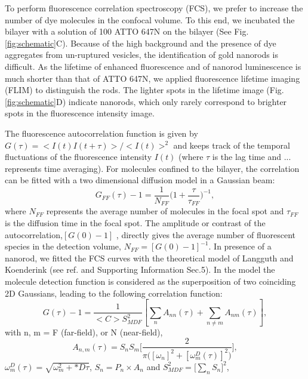 To perform fluorescence correlation spectroscopy (FCS), we prefer to increase the number of dye molecules in the confocal volume.
To this end, we incubated the bilayer with a solution of \SI{100}{\nM} ATTO 647N on the bilayer (See Fig. \ref{fig:schematic}C).
Because of the high background and the presence of dye aggregates from un-ruptured vesicles, the identification of gold nanorods is difficult.
As the lifetime of enhanced fluorescence and of nanorod luminescence is much shorter than that of ATTO 647N, we applied fluorescence lifetime imaging (FLIM) to distinguish the rods.
The lighter spots in the lifetime image (Fig.\ref{fig:schematic}D) indicate nanorods, which only rarely correspond to brighter spots in the fluorescence intensity image.

The fluorescence autocorrelation function is given by $G(\tau)=<I(t)I(t+\tau)>/<I(t)>^2$ and keeps track of the temporal fluctuations of the fluorescence intensity $I(t)$ (where $\tau$ is the lag time and ... represents time averaging).
For molecules confined to the bilayer, the correlation can be fitted with a two dimensional diffusion model in a Gaussian beam:
\begin{equation}
	G_{FF}(\tau)-1 = \frac{1}{N_{FF}}\bigg(1+\frac{\tau}{\tau_{FF}} \bigg)^{-1},
	\label{eq:2D-gauss-diffusion}
\end{equation}
where $N_{FF}$ represents the average number of molecules in the focal spot and $\tau_{FF}$ is the diffusion time in the focal spot.
The amplitude or contrast of the autocorrelation,$[G(0)-1]$ , directly gives the average number of fluorescent species in the detection volume, $N_{FF}=[G(0)-1]^{-1}$.
In presence of a nanorod, we fitted the FCS curves with the theoretical model of Langguth and Koenderink (see ref.\cite{langguth2014simple} and Supporting Information Sec.5).
In the model the molecule detection function is considered as the superposition of two coinciding 2D Gaussians, leading to the following correlation function:
\begin{equation}
	G(\tau)-1 = \frac{1}{<C>S_{MDF}^2}[\sum_{n}A_{nn}(\tau) + \sum_{n\neq m}A_{nm}(\tau)],
	\label{eqm:far-near-gauss}
\end{equation}
with n, m = F (far-field), or N (near-field),
\begin{equation}
	A_{n,m}(\tau)=S_nS_m\Bigg[\frac{2}{\pi\Big([\omega_n]^2 + [\omega_m^D(\tau)]^2 \Big)}\Bigg] ,
	\label{eqm:area-gauss}
\end{equation}
$\omega_m^D(\tau)=\sqrt{\omega_m^2 + *D\tau}$, $S_n=P_n\times A_n$ and $S_{MDF}^2=\Big[\sum_{n}S_n\Big]^2$,

